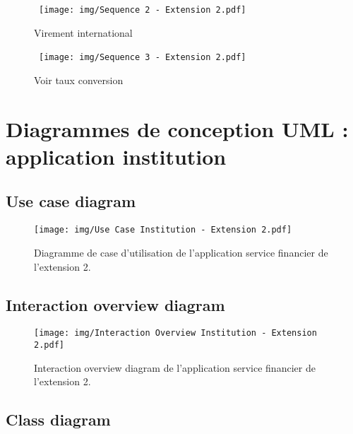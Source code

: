\documentclass[]{report}
\begin{document}
\begin{figure}[h!]
	\hbox{
		\centering\texttt{[image: img/Sequence 2 - Extension 2.pdf]}
	}
	\caption{Virement international}
	\end{figure}

\newpage

\begin{figure}[h!]
	\hbox{
		\centering\texttt{[image: img/Sequence 3 - Extension 2.pdf]}
	}
	\caption{Voir taux conversion}
\end{figure}

\newpage



\section{Diagrammes de conception UML : application institution}



\subsection{Use case diagram}

\begin{figure}[h]
	\centering\texttt{[image: img/Use Case Institution - Extension 2.pdf]}
	\caption{Diagramme de case d'utilisation de l'application service financier de l'extension 2.}
\end{figure}


\newpage

\subsection{Interaction overview diagram}

\begin{figure}[h]
	\centering\texttt{[image: img/Interaction Overview Institution - Extension 2.pdf]}
	\caption{Interaction overview diagram de l'application service financier de l'extension 2.}
\end{figure}


\newpage

\subsection{Class diagram}
\end{document}
